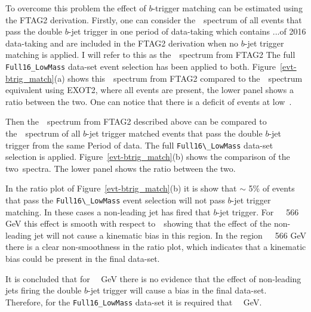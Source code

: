 To overcome this problem the effect of $b$-trigger matching can be estimated using the FTAG2 derivation.
Firstly, one can consider the~\mjj~spectrum of all events that pass the double $b$-jet trigger in
one period of data-taking which contains ...\ifb  of 2016 data-taking and
are included in the FTAG2 derivation when no $b$-jet trigger matching is applied.
I will refer to this as the~\mjj~spectrum from FTAG2
The full \verb|Full16_LowMass| data-set event selection has been applied to both.
Figure~\ref{evt-btrig_match}(a) shows this~\mjj~spectrum from FTAG2
compared to the~\mjj~spectrum equivalent using EXOT2, where all events are present,
the lower panel shows a ratio between the two.
One can notice that there is a deficit of events at low~\mjj.

Then the~\mjj~spectrum from FTAG2 described above can be compared to the~\mjj~spectrum of
all $b$-jet trigger matched events that pass the double $b$-jet trigger from the same Period of data.
The full \verb|Full16\_LowMass| data-set selection is applied.
Figure~\ref{evt-btrig_match}(b) shows the comparison of the two~\mjj spectra.
The lower panel shows the ratio between the two.

In the ratio plot of Figure~\ref{evt-btrig_match}(b) it is show that $\sim$ 5\% of events that
pass the \verb|Full16\_LowMass| event selection will not pass $b$-jet trigger matching.
In these cases a non-leading jet has fired that $b$-jet trigger.
For~\mjj~\gt~566 GeV this effect is smooth with respect to~\mjj~showing
that the effect of the non-leading jet will not cause a kinematic bias in this region.
In the region~\mjj~\lt~566 GeV there is a clear non-smoothness in the ratio plot,
which indicates that a kinematic bias could be present in the final data-set.

It is concluded that for~\mjj~ GeV there is no evidence that
the effect of non-leading jets firing the double $b$-jet trigger
will cause a bias in the final data-set.
Therefore, for the \verb|Full16_LowMass| data-set it is required that~\mjj~ GeV.

